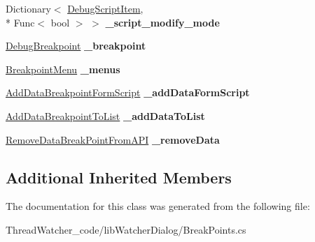 \begin{DoxyCompactItemize}
\item 
\hypertarget{classlib_watcher_dialog_1_1_break_points_ref_a10ac34262fd4bd3a2d96e6f08eb380fc}{Dictionary$<$ \hyperlink{classlib_watcher_dialog_1_1_property_item_1_1_debug_script_1_1_debug_script_item}{Debug\+Script\+Item}, \\*
Func$<$ bool $>$ $>$ {\bfseries \+\_\+script\+\_\+modify\+\_\+mode}}\label{classlib_watcher_dialog_1_1_break_points_ref_a10ac34262fd4bd3a2d96e6f08eb380fc}

\item 
\hypertarget{classlib_watcher_dialog_1_1_break_points_ref_a72f0bb6229cc5acdee31febed5f50f1a}{\hyperlink{classlib_wather_debugger_1_1_breakpoint_1_1_debug_breakpoint}{Debug\+Breakpoint} {\bfseries \+\_\+breakpoint}}\label{classlib_watcher_dialog_1_1_break_points_ref_a72f0bb6229cc5acdee31febed5f50f1a}

\item 
\hypertarget{classlib_watcher_dialog_1_1_break_points_ref_a7f3d8b2d3cf7fae8f7f6f4ea6112f8a2}{\hyperlink{classlib_watcher_dialog_1_1_property_item_1_1_break_point_1_1_breakpoint_menu}{Breakpoint\+Menu} {\bfseries \+\_\+menus}}\label{classlib_watcher_dialog_1_1_break_points_ref_a7f3d8b2d3cf7fae8f7f6f4ea6112f8a2}

\item 
\hypertarget{classlib_watcher_dialog_1_1_break_points_ref_ad1e51f6ec3ba7bd639d3ca0318793895}{\hyperlink{classlib_watcher_dialog_1_1_combine_rules_1_1_add_data_breakpoint_form_script}{Add\+Data\+Breakpoint\+Form\+Script} {\bfseries \+\_\+add\+Data\+Form\+Script}}\label{classlib_watcher_dialog_1_1_break_points_ref_ad1e51f6ec3ba7bd639d3ca0318793895}

\item 
\hypertarget{classlib_watcher_dialog_1_1_break_points_ref_a261f59c64f3d686583acca8a1792c3bf}{\hyperlink{classlib_watcher_dialog_1_1_combine_rules_1_1_add_data_breakpoint_to_list}{Add\+Data\+Breakpoint\+To\+List} {\bfseries \+\_\+add\+Data\+To\+List}}\label{classlib_watcher_dialog_1_1_break_points_ref_a261f59c64f3d686583acca8a1792c3bf}

\item 
\hypertarget{classlib_watcher_dialog_1_1_break_points_ref_adb35d0601d54489bbbb9533e57470e59}{\hyperlink{classlib_watcher_dialog_1_1_combine_rules_1_1_remove_data_break_point_from_a_p_i}{Remove\+Data\+Break\+Point\+From\+A\+P\+I} {\bfseries \+\_\+remove\+Data}}\label{classlib_watcher_dialog_1_1_break_points_ref_adb35d0601d54489bbbb9533e57470e59}

\end{DoxyCompactItemize}
\subsection*{Additional Inherited Members}


The documentation for this class was generated from the following file\+:\begin{DoxyCompactItemize}
\item 
Thread\+Watcher\+\_\+code/lib\+Watcher\+Dialog/Break\+Points.\+cs\end{DoxyCompactItemize}

